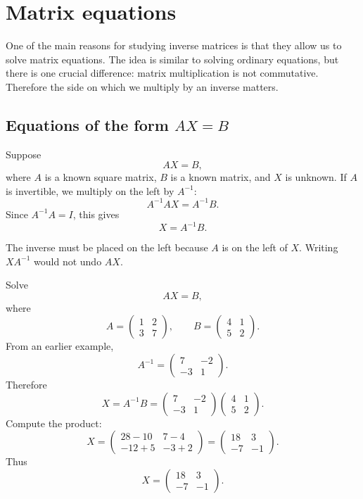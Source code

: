 \section{Matrix equations}

One of the main reasons for studying inverse matrices is that they allow us to solve matrix equations. The idea is similar to solving ordinary equations, but there is one crucial difference: matrix multiplication is not commutative. Therefore the side on which we multiply by an inverse matters.

\subsection{Equations of the form \(AX=B\)}

Suppose
\[
AX=B,
\]
where \(A\) is a known square matrix, \(B\) is a known matrix, and \(X\) is unknown. If \(A\) is invertible, we multiply on the left by \(A^{-1}\):
\[
A^{-1}AX=A^{-1}B.
\]
Since \(A^{-1}A=I\), this gives
\[
X=A^{-1}B.
\]

The inverse must be placed on the left because \(A\) is on the left of \(X\). Writing \(XA^{-1}\) would not undo \(AX\).

\begin{examplebox}
Solve
\[
AX=B,
\]
where
\[
A=\begin{pmatrix}1&2\\3&7\end{pmatrix},
\qquad
B=\begin{pmatrix}4&1\\5&2\end{pmatrix}.
\]
From an earlier example,
\[
A^{-1}=\begin{pmatrix}7&-2\\-3&1\end{pmatrix}.
\]
Therefore
\[
X=A^{-1}B
=\begin{pmatrix}7&-2\\-3&1\end{pmatrix}
\begin{pmatrix}4&1\\5&2\end{pmatrix}.
\]
Compute the product:
\[
X=\begin{pmatrix}
28-10&7-4\\
-12+5&-3+2
\end{pmatrix}
=\begin{pmatrix}
18&3\\
-7&-1
\end{pmatrix}.
\]
Thus
\[
X=\begin{pmatrix}18&3\\-7&-1\end{pmatrix}.
\]
\end{examplebox}

